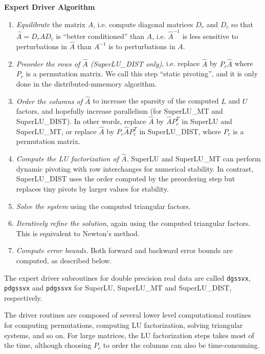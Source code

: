 \vspace*{.1in}
\noindent
{\bf Expert Driver Algorithm}
\begin{enumerate}
\item {\em Equilibrate} the matrix $A$, i.e. compute diagonal matrices $D_r$
and $D_c$ so that $\hat{A} = D_r A D_c$ is ``better conditioned'' than $A$, 
i.e. $\hat{A}^{-1}$ is less sensitive to perturbations in $\hat{A}$
than $A^{-1}$ is to perturbations in $A$.
\item {\em Preorder the rows of $\hat{A}$ (SuperLU\_DIST only)},
i.e. replace $\hat{A}$ by $P_r \hat{A}$ where $P_r$ is a permutation matrix.
We call this step ``static pivoting'', and it is only done in the
distributed-mmemory algorithm.
\item {\em Order the columns of $\hat{A}$} to increase the sparsity of the
computed $L$ and $U$ factors, and hopefully increase parallelism
(for SuperLU\_MT and  SuperLU\_DIST). In other words,
replace $\hat{A}$ by $\hat{A} P_c^T$ in SuperLU and SuperLU\_MT,
or replace $\hat{A}$ by $P_c\hat{A} P_c^T$ in SuperLU\_DIST,
where $P_c$ is a permutation matrix.
\item {\em Compute the LU factorization of $\hat{A}$.} SuperLU and SuperLU\_MT
can perform dynamic pivoting with row interchanges for
numerical stability.
In contrast, SuperLU\_DIST uses the order computed by the preordering step 
but replaces tiny pivots by larger values for stability.
\item {\em Solve the system} using the computed triangular factors.
\item {\em Iteratively refine the solution}, again using the computed
	triangular factors. This is equivalent to Newton's method.
\item {\em Compute error bounds.} Both forward and backward error bounds
	are computed, as described below.
\end{enumerate}

The expert driver subroutines for double precision real data are called 
{\tt dgssvx}, {\tt pdgssvx} and {\tt pdgssvx} for 
SuperLU, SuperLU\_MT and SuperLU\_DIST, respectively.
The driver routines are composed of several lower level computational routines
for computing permutations, computing LU factorization, solving triangular
systems, and so on.
For large matrices, the LU factorization steps takes most of the
time, although choosing $P_c$ to order the columns can also be time-consuming.

